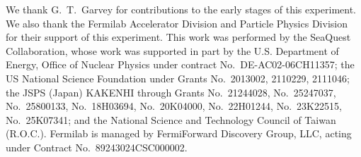 \documentclass[reprint,aps,unsortedaddress,superscriptaddress,prl,floatfix,showpacs,linenumbers]{revtex4-2}
\begin{document}
\begin{acknowledgments}
	We thank G.~T.~Garvey for contributions to the early stages of this experiment. %
	We also thank the Fermilab Accelerator Division and Particle Physics Division for their support of this experiment. %
	This work was performed by the SeaQuest Collaboration, whose work was supported in part by the
	U.S. Department of Energy, Office of Nuclear Physics under contract No.\ 
	DE-AC02-06CH11357; %
	the US National Science Foundation under Grants No.\ 
	2013002, %
	2110229, %
	2111046; %
	the JSPS (Japan) KAKENHI through Grants No.\ 21244028, No.\ 25247037, No.\ 25800133, No.\ 18H03694, No.\ 20K04000, No.\ 22H01244, No.\ 23K22515, No.\ 25K07341; %
	and the National Science and Technology Council of Taiwan (R.O.C.). %
	Fermilab is managed by FermiForward Discovery Group, LLC, acting under Contract No.\ 89243024CSC000002. %
\end{acknowledgments}


\clearpage
\onecolumngrid
\appendix
\end{document}
